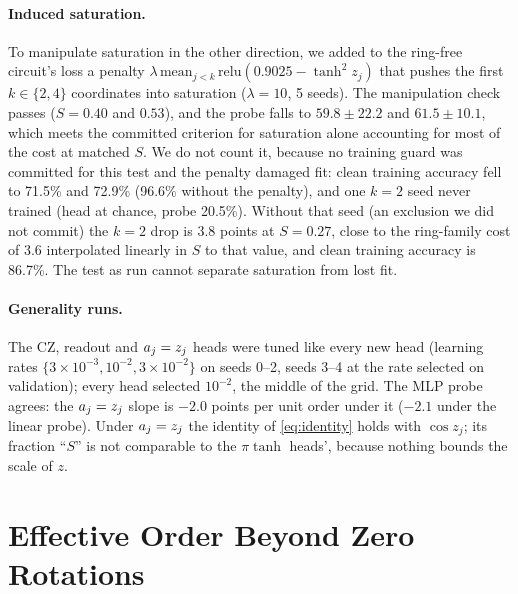 \paragraph{Induced saturation.} To manipulate saturation in the other direction, we added to the
ring-free circuit's loss a penalty $\lambda\,\mathrm{mean}_{j<k}\,\mathrm{relu}(0.9025-\tanh^2z_j)$ that
pushes the first $k\in\{2,4\}$ coordinates into saturation ($\lambda=10$, 5 seeds). The manipulation
check passes ($S=0.40$ and $0.53$), and the probe falls to $59.8\pm22.2$ and $61.5\pm10.1$, which
meets the committed criterion for saturation alone accounting for most of the cost at matched $S$. We
do not count it, because no training guard was committed for this test and the penalty damaged fit:
clean training accuracy fell to 71.5\% and 72.9\% (96.6\% without the penalty), and one $k=2$ seed never
trained (head at chance, probe 20.5\%). Without that seed (an exclusion we did not commit) the $k=2$ drop
is 3.8 points at $S=0.27$, close to the ring-family cost of 3.6 interpolated linearly in $S$ to that value, and clean training accuracy is
86.7\%. The test as run cannot separate saturation from lost fit.

\paragraph{Generality runs.} The CZ, readout and $a_{j}=z_j$ heads were tuned like every new head
(learning rates $\{3\times10^{-3},10^{-2},3\times10^{-2}\}$ on seeds 0--2, seeds 3--4 at the rate
selected on validation); every head selected $10^{-2}$, the middle of the grid. The MLP probe agrees:
the $a_{j}=z_j$ slope is $-2.0$ points per unit order under it ($-2.1$ under the linear probe).
Under $a_{j}=z_j$ the identity of \cref{eq:identity} holds with $\cos z_j$; its fraction ``$S$'' is
not comparable to the $\pi\tanh$ heads', because nothing bounds the scale of $z$.

\section{Effective Order Beyond Zero Rotations}
\label{app:efforder}



